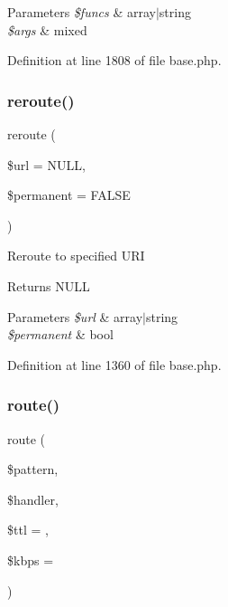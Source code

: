 \begin{DoxyParams}{Parameters}
{\em \$funcs} & array$\vert$string \\
\hline
{\em \$args} & mixed \\
\hline
\end{DoxyParams}


Definition at line 1808 of file base.\+php.

\hypertarget{class_base_a5a8efc7bc5d742984142bbcd2266128d}{}\label{class_base_a5a8efc7bc5d742984142bbcd2266128d} 
\subsubsection{\texorpdfstring{reroute()}{reroute()}}
{\footnotesize\ttfamily reroute (\begin{DoxyParamCaption}\item[{}]{\$url = {\ttfamily NULL},  }\item[{}]{\$permanent = {\ttfamily FALSE} }\end{DoxyParamCaption})}

Reroute to specified U\+RI \begin{DoxyReturn}{Returns}
N\+U\+LL 
\end{DoxyReturn}

\begin{DoxyParams}{Parameters}
{\em \$url} & array$\vert$string \\
\hline
{\em \$permanent} & bool \\
\hline
\end{DoxyParams}


Definition at line 1360 of file base.\+php.

\hypertarget{class_base_a369026a3cb8f321eadc19535ee308b2d}{}\label{class_base_a369026a3cb8f321eadc19535ee308b2d} 
\subsubsection{\texorpdfstring{route()}{route()}}
{\footnotesize\ttfamily route (\begin{DoxyParamCaption}\item[{}]{\$pattern,  }\item[{}]{\$handler,  }\item[{}]{\$ttl = {},  }\item[{}]{\$kbps = {} }\end{DoxyParamCaption})}

